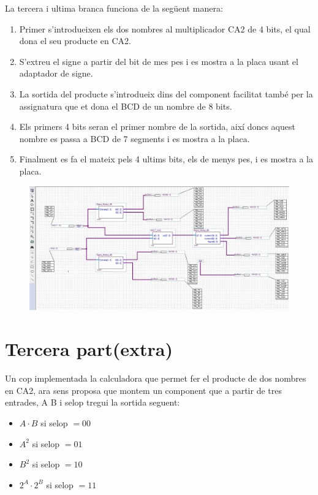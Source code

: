 \documentclass[12pt, a4papre]{article}
\begin{document}
	La tercera i ultima branca funciona de la següent manera:
	\begin{enumerate}
	\item Primer s'introdueixen els dos nombres al multiplicador CA2 de 4 bits, el qual dona el seu producte en CA2.
	\item S'extreu el signe a partir del bit de mes pes i es mostra a la placa usant el adaptador de signe.
	\item La sortida del producte s'introdueix dins del component facilitat també per la assignatura que et dona el BCD de un nombre de 8 bits.
	\item Els primers 4 bits seran el primer nombre de la sortida, així doncs aquest nombre es passa a BCD de 7 segments i es mostra a la placa.
	\item Finalment es fa el mateix pels 4 ultims bits, els de menys pes, i es mostra a la placa.
	\end{enumerate}
	
	\begin{center}
	\begin{figure}[H]
		\begin{center}
		\includegraphics[width=150mm]{multFinal.jpeg}
		\end{center}
	\end{figure}
	
	\end{center}
	
	\newpage
	\section{Tercera part(extra)}
	
	Un cop implementada la calculadora que permet fer el producte de dos nombres en CA2, ara sens proposa que montem un component que a partir de tres entrades, A B i selop tregui la sortida seguent:
	
	\begin{itemize}
	\item $A\cdot B$ si selop $=00$
	\item $A^2$ si selop $=01$
	\item $B^2$ si selop $=10$
	\item$2^A\cdot2^B$ si selop $=11$
	\end{itemize}
	
\end{document}
